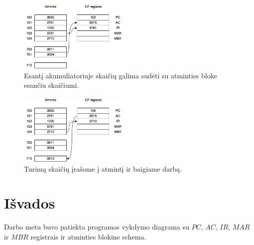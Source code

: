 \documentclass[11pt,a4paper]{article}
\begin{document}
    \begin{figure}[H]
        \centering
        \includegraphics[width=200px]{img/operacines-sistemos-04.png}
        \caption{Esantį akumuliatoriuje skaičių galima sudėti su atminties bloke esančiu skaičiumi.}
    \end{figure}

    \begin{figure}[H]
        \centering
        \includegraphics[width=200px]{img/operacines-sistemos-05.png}
        \caption{Turimą skaičių įrašome į atmintį ir baigiame darbą.}
    \end{figure}

    \section{Išvados}

    Darbo metu buvo patiekta programos vykdymo diagrama su $PC$, $AC$, $IR$, $MAR$ ir $MBR$ registrais ir atminties blokine schema.
\end{document}
